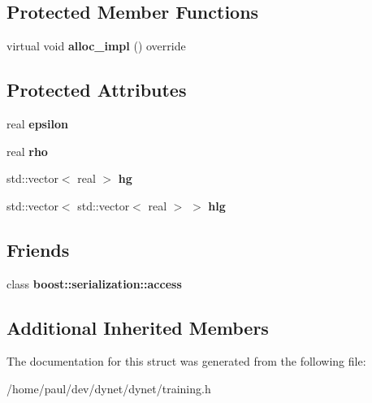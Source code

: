 \subsection*{Protected Member Functions}
\begin{DoxyCompactItemize}
\item 
\hypertarget{structdynet_1_1RmsPropTrainer_a7161b50fbf7673c7c7c7180c1e591e81}{}virtual void {\bfseries alloc\+\_\+impl} () override\label{structdynet_1_1RmsPropTrainer_a7161b50fbf7673c7c7c7180c1e591e81}

\end{DoxyCompactItemize}
\subsection*{Protected Attributes}
\begin{DoxyCompactItemize}
\item 
\hypertarget{structdynet_1_1RmsPropTrainer_abea2f280bd81e66c84d19243240e5d07}{}real {\bfseries epsilon}\label{structdynet_1_1RmsPropTrainer_abea2f280bd81e66c84d19243240e5d07}

\item 
\hypertarget{structdynet_1_1RmsPropTrainer_aa32e89c3dd7251f0315d05e09376f97f}{}real {\bfseries rho}\label{structdynet_1_1RmsPropTrainer_aa32e89c3dd7251f0315d05e09376f97f}

\item 
\hypertarget{structdynet_1_1RmsPropTrainer_af700a2a0cc9dc136a98a7260522c5947}{}std\+::vector$<$ real $>$ {\bfseries hg}\label{structdynet_1_1RmsPropTrainer_af700a2a0cc9dc136a98a7260522c5947}

\item 
\hypertarget{structdynet_1_1RmsPropTrainer_aef4e1f6d56c30ef3d5d1d01d2b2df918}{}std\+::vector$<$ std\+::vector$<$ real $>$ $>$ {\bfseries hlg}\label{structdynet_1_1RmsPropTrainer_aef4e1f6d56c30ef3d5d1d01d2b2df918}

\end{DoxyCompactItemize}
\subsection*{Friends}
\begin{DoxyCompactItemize}
\item 
\hypertarget{structdynet_1_1RmsPropTrainer_ac98d07dd8f7b70e16ccb9a01abf56b9c}{}class {\bfseries boost\+::serialization\+::access}\label{structdynet_1_1RmsPropTrainer_ac98d07dd8f7b70e16ccb9a01abf56b9c}

\end{DoxyCompactItemize}
\subsection*{Additional Inherited Members}


The documentation for this struct was generated from the following file\+:\begin{DoxyCompactItemize}
\item 
/home/paul/dev/dynet/dynet/training.\+h\end{DoxyCompactItemize}
